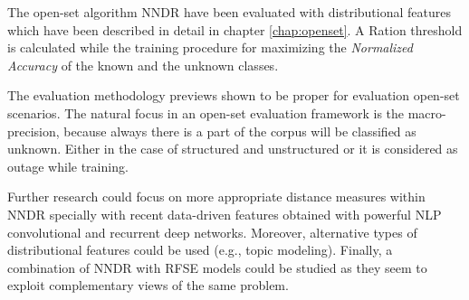 The open-set algorithm NNDR have been evaluated with distributional features which have been described in detail in chapter \ref{chap:openset}. A \textDistance Ration threshold is calculated while the training procedure for maximizing the \textit{Normalized Accuracy} of the known and the unknown classes.

The evaluation methodology previews shown to be proper for evaluation open-set scenarios. The natural focus in an open-set evaluation framework is the macro-precision, because always there is a part of the corpus will be classified as unknown. Either in the case of structured and unstructured or it is considered as outage while training.

Further research could focus on more appropriate distance measures within NNDR specially with recent data-driven features obtained with powerful NLP convolutional and recurrent deep networks. Moreover, alternative types of distributional features could be used (e.g., topic modeling). Finally, a combination of NNDR with RFSE models could be studied as they seem to exploit complementary views of the same problem.

